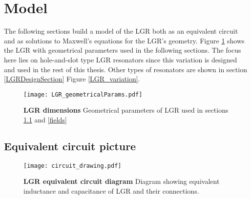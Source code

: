 \section{Model}

The following sections build a model of the LGR both as an equivalent circuit and as solutions to Maxwell's equations for the LGR's geometry. Figure \ref{LGR_geometry1} shows the LGR with geometrical parameters used in the following sections. The focus here lies on hole-and-slot type LGR resonators since this variation is designed and used in the rest of this thesis. Other types of resonators are shown in section \ref{LGRDesignSection} Figure \ref{LGR_variation}.


\begin{figure}[h!]
\centering
\texttt{[image: LGR\_geometricalParams.pdf]}  
\caption{\textbf{LGR dimensions} Geometrical parameters of LGR used in sections \ref{circuit} and \ref{fields}}
\label{LGR_geometry1}
\end{figure}


\subsection{Equivalent circuit picture} \label{circuit}

\begin{figure}[t!]
\centering
\texttt{[image: circuit\_drawing.pdf]}  
\caption{\textbf{LGR equivalent circuit diagram} Diagram showing equivalent inductance and capacitance of LGR and their connections.}
\label{circuitdiagram}
\end{figure}

